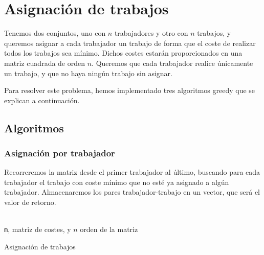 \documentclass[a4paper, 11pt]{article} %
\begin{document}
\section{Asignación de trabajos}
Tenemos dos conjuntos, uno con $n$ trabajadores y otro con $n$ trabajos, y queremos asignar a cada trabajador un trabajo de forma
que el coste de realizar todos los trabajos sea mínimo. Dichos costes estarán proporcionados en una matriz cuadrada
de orden $n$. Queremos que cada trabajador realice únicamente un trabajo, y que no haya ningún trabajo sin asignar. 

Para resolver este problema, hemos implementado tres algoritmos greedy que se explican a continuación. 
	\subsection{Algoritmos}
		\subsubsection{Asignación por trabajador}
		Recorreremos la matriz desde el primer trabajador al último, buscando para cada trabajador el trabajo con coste mínimo que no esté ya asignado a algún trabajador. Almacenaremos los pares trabajador-trabajo en un vector, que será el valor de retorno. 
		
		\begin{algorithm}[H]
			\begin{algorithmic}[1]
				\REQUIRE \ \\
					\texttt{m}, matriz de costes, y $n$ orden de la matriz\\
		            	\ENDIF
		            \ENDIF
		          \ENDFOR
		        \ENDFOR  	
		        
			\end{algorithmic}
		    \caption{Asignación de trabajos}
		    \label{Asignación Trabajos}
		\end{algorithm}
		
\end{document}
